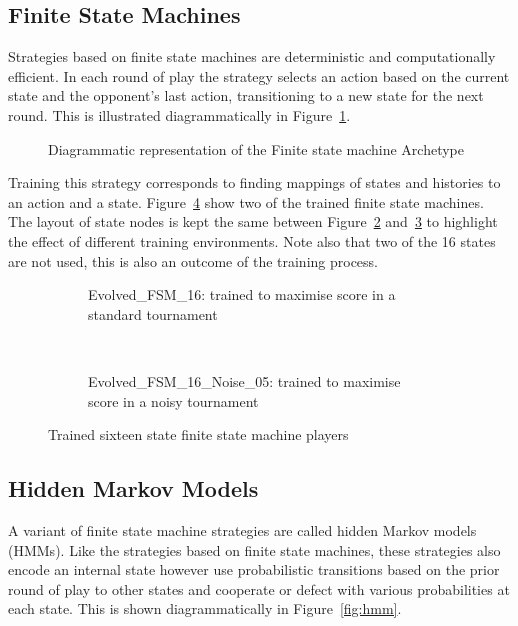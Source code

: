 \documentclass{article}
\begin{document}
\subsection{Finite State Machines}

Strategies based on finite state machines are deterministic and computationally efficient.
In each round of play the strategy selects an action based on the current state
and the opponent's last action, transitioning to a new state for the next round.
This is illustrated diagrammatically in Figure~\ref{fig:fsm}.

\begin{figure}[!hbtp]
    \centering
    
    \caption{Diagrammatic representation of the Finite state machine Archetype}
    \label{fig:fsm}
\end{figure}

Training this strategy corresponds to finding mappings of states and histories
to an action and a state. Figure~\ref{fig:fsm_images} show two of the trained
finite state machines. The layout of state nodes is kept the same between
Figure~\ref{fig:fsm16} and~\ref{fig:fsm16noise} to highlight the effect of
different training environments. Note also that two of the 16 states are not
used, this is also an outcome of the training process.


\begin{figure}[!hbtp]
    \centering
    \begin{subfigure}[t]{.5\textwidth}
        
        \caption{Evolved\_FSM\_16: trained to maximise score in a standard
        tournament}
        \label{fig:fsm16}
    \end{subfigure}%
    ~
    \begin{subfigure}[t]{.5\textwidth}
        \centering
        
        \caption{Evolved\_FSM\_16\_Noise\_05: trained to maximise score in a
        noisy tournament}
        \label{fig:fsm16noise}
    \end{subfigure}%
    \caption{Trained sixteen state finite state machine players}
    \label{fig:fsm_images}
\end{figure}


\subsection{Hidden Markov Models}

A variant of finite state machine strategies are called hidden Markov models
(HMMs). Like the strategies based on finite state machines, these strategies
also encode an internal state however use probabilistic transitions based on the
prior round of play to other states and cooperate or defect with various
probabilities at each state. This is
shown diagrammatically in Figure~\ref{fig:hmm}.
\end{document}
